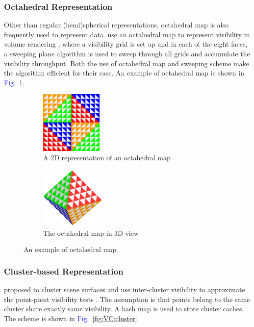 \documentclass[]{book}
\renewcommand{\figurename}{\textcolor{blue}{Fig.\ }}
\begin{document}
\subsubsection*{Octahedral Representation}
Other than regular (hemi)spherical representations, octahedral map is also frequently used to represent data.
\citeauthor{von2016efficient} use an octahedral map to represent visibility in volume rendering \cite{von2016efficient}, where a visibility grid is set up and in each of the eight faces, a sweeping plane algorithm is used to sweep through all grids and accumulate the visibility throughput.
Both the use of octahedral map and sweeping scheme make the algorithm efficient for their case.
An example of octahedral map is shown in \figurename \ref{fig:VC:octahedra}.

\begin{figure}[t]
	\begin{subfigure}{0.5\textwidth}
		\centering
		\includegraphics[height=1.2in]{img/VC-3-octa-1.png}
		\caption{A 2D representation of an octahedral map}
	\end{subfigure}%
		\begin{subfigure}{0.5\textwidth}
		\centering
		\includegraphics[height=1.2in]{img/VC-3-octa-2.png}
		\caption{The octahedral map in 3D view}
	\end{subfigure}
	\caption[Octehadral Maps]{An example of octahedral map.}
	\label{fig:VC:octahedra}
\end{figure}

\subsubsection*{Cluster-based Representation}
\citeauthor{popov2013adaptive} proposed to cluster scene surfaces and use inter-cluster visibility to approximate the point-point visibility tests \cite{popov2013adaptive}.
The assumption is that points belong to the same cluster share exactly same visibility.
A hash map is used to store cluster caches.
The scheme is shown in \figurename \ref{fig:VC:cluster}.
\end{document}
